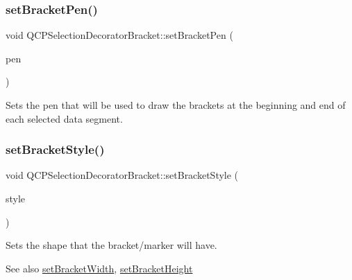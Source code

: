 \subsubsection{\texorpdfstring{set\+Bracket\+Pen()}{setBracketPen()}}
{\footnotesize\ttfamily void Q\+C\+P\+Selection\+Decorator\+Bracket\+::set\+Bracket\+Pen (\begin{DoxyParamCaption}\item[{const Q\+Pen \&}]{pen }\end{DoxyParamCaption})}

Sets the pen that will be used to draw the brackets at the beginning and end of each selected data segment. \mbox{\label{class_q_c_p_selection_decorator_bracket_a04507697438f6ad8cc2aeea5422dcbe5}} 
\subsubsection{\texorpdfstring{set\+Bracket\+Style()}{setBracketStyle()}}
{\footnotesize\ttfamily void Q\+C\+P\+Selection\+Decorator\+Bracket\+::set\+Bracket\+Style (\begin{DoxyParamCaption}\item[{\hyperlink{class_q_c_p_selection_decorator_bracket_aa6d18517ec0553575bbef0de4252336e}{Q\+C\+P\+Selection\+Decorator\+Bracket\+::\+Bracket\+Style}}]{style }\end{DoxyParamCaption})}

Sets the shape that the bracket/marker will have.

\begin{DoxySeeAlso}{See also}
\hyperlink{class_q_c_p_selection_decorator_bracket_a291b59cab98ce93a0a3c85963fe10f5e}{set\+Bracket\+Width}, \hyperlink{class_q_c_p_selection_decorator_bracket_aed773ad737201cca40efc6fe451acad8}{set\+Bracket\+Height} 
\end{DoxySeeAlso}
\mbox{\label{class_q_c_p_selection_decorator_bracket_a291b59cab98ce93a0a3c85963fe10f5e}} 
